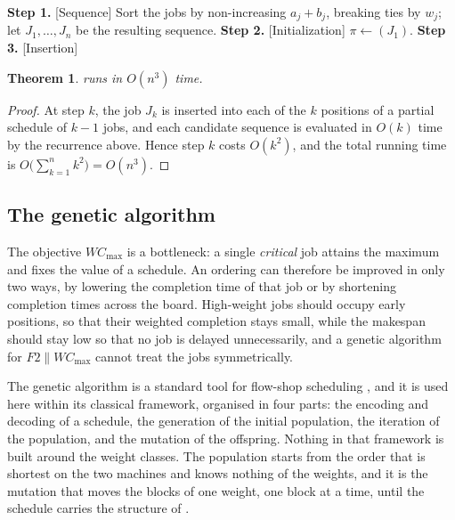 \documentclass[12pt]{article}
\newtheorem{theorem}{Theorem}[section]
\begin{document}
\begin{sloppypar}
        \begin{algorithm}[H]
            \small
            \linespread{1.2}\selectfont
            \SetAlgoLined
            \DontPrintSemicolon
            \caption{NEH heuristic for $F2 \parallel W C_{\max}$}\label{alg:neh}
            \BlankLine
            \textbf{Step 1.} [Sequence] Sort the jobs by non-increasing $a_j+b_j$, breaking ties by $w_j$; 
            let $J_{1},\dots,J_{n}$ be the resulting sequence. \;
            \textbf{Step 2.} [Initialization] $\pi\gets(J_{1})$. \;
            \textbf{Step 3.} [Insertion] 
        \end{algorithm}
        
        \begin{theorem}\label{prop:neh-complexity}
             runs in $O(n^3)$ time.
        \end{theorem}
        \begin{proof}
            At step $k$, the job $J_{k}$ is inserted into each of the $k$ positions of a partial
            schedule of $k-1$ jobs, and each candidate sequence is evaluated in $O(k)$ time by the
            recurrence above. Hence step $k$ costs $O(k^2)$, and the total running time is
            $O\bigl(\sum_{k=1}^{n}k^2\bigr)=O(n^3)$.
        \end{proof}
        
        \subsection{The genetic algorithm}
        \label{sub:ga}
        
        The objective $W C_{\max}$ is a bottleneck: a single \emph{critical} job attains the maximum
        and fixes the value of a schedule. An ordering can therefore be improved in only two ways, by
        lowering the completion time of that job or by shortening completion times across the board.
        High-weight jobs should occupy early positions, so that their weighted completion stays small,
        while the makespan should stay low so that no job is delayed unnecessarily, and a genetic
        algorithm for $F2 \parallel W C_{\max}$ cannot treat the jobs symmetrically.
        
        The genetic algorithm is a standard tool for flow-shop scheduling \citep{qiao2022adaptive}, and
        it is used here within its classical framework, organised in four parts: the encoding and
        decoding of a schedule, the generation of the initial population, the iteration of the
        population, and the mutation of the offspring. Nothing in that framework is built around the
        weight classes. The population starts from the order that is shortest on the two machines and
        knows nothing of the weights, and it is the mutation that moves the blocks of one weight, one
        block at a time, until the schedule carries the structure of .
        

\end{sloppypar}
\end{document}
